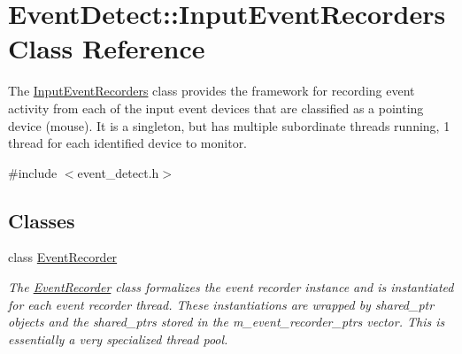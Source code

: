 \hypertarget{classEventDetect_1_1InputEventRecorders}{}\section{Event\+Detect\+:\+:Input\+Event\+Recorders Class Reference}
\label{classEventDetect_1_1InputEventRecorders}


The \mbox{\hyperlink{classEventDetect_1_1InputEventRecorders}{Input\+Event\+Recorders}} class provides the framework for recording event activity from each of the input event devices that are classified as a pointing device (mouse). It is a singleton, but has multiple subordinate threads running, 1 thread for each identified device to monitor.  




{\ttfamily \#include $<$event\+\_\+detect.\+h$>$}

\subsection*{Classes}
\begin{DoxyCompactItemize}
\item 
class \mbox{\hyperlink{classEventDetect_1_1InputEventRecorders_1_1EventRecorder}{Event\+Recorder}}
\begin{DoxyCompactList}\small\item\em The \mbox{\hyperlink{classEventDetect_1_1InputEventRecorders_1_1EventRecorder}{Event\+Recorder}} class formalizes the event recorder instance and is instantiated for each event recorder thread. These instantiations are wrapped by shared\+\_\+ptr objects and the shared\+\_\+ptrs stored in the m\+\_\+event\+\_\+recorder\+\_\+ptrs vector. This is essentially a very specialized thread pool. \end{DoxyCompactList}\end{DoxyCompactItemize}
